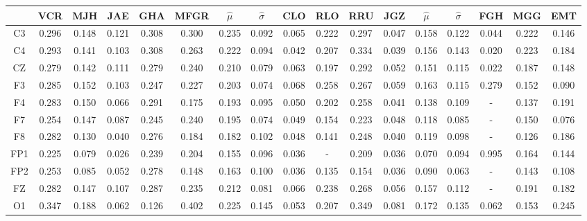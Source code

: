 \begin{SidewaysFigure}
\centering
\begin{tabular}{c||ccccc|cc||cccc|cc||ccc}
& VCR & MJH & JAE & GHA & MFGR &$\widehat{\mu}$ & $\widehat{\sigma}$
& CLO & RLO & RRU & JGZ &$\widehat{\mu}$ & $\widehat{\sigma}$
& FGH & MGG & EMT \\
\hline
 C3 & 0.296    & 0.148    & 0.121    & 0.308    & 0.300    & 0.235    & 0.092    & 0.065    & 0.222    & 0.297    & 0.047    & 0.158    & 0.122    & 0.044    & 0.222    & 0.146     \\
 C4 & 0.293    & 0.141    & 0.103    & 0.308    & 0.263    & 0.222    & 0.094    & 0.042    & 0.207    & 0.334    & 0.039    & 0.156    & 0.143    & 0.020    & 0.223    & 0.184     \\
 CZ & 0.279    & 0.142    & 0.111    & 0.279    & 0.240    & 0.210    & 0.079    & 0.063    & 0.197    & 0.292    & 0.052    & 0.151    & 0.115    & 0.022    & 0.187    & 0.148     \\
 F3 & 0.285    & 0.152    & 0.103    & 0.247    & 0.227    & 0.203    & 0.074    & 0.068    & 0.258    & 0.267    & 0.059    & 0.163    & 0.115    & 0.279    & 0.152    & 0.090     \\
 F4 & 0.283    & 0.150    & 0.066    & 0.291    & 0.175    & 0.193    & 0.095    & 0.050    & 0.202    & 0.258    & 0.041    & 0.138    & 0.109    & -      & 0.137    & 0.191     \\
 F7 & 0.254    & 0.147    & 0.087    & 0.245    & 0.240    & 0.195    & 0.074    & 0.049    & 0.154    & 0.223    & 0.048    & 0.118    & 0.085    & -      & 0.150    & 0.076     \\
 F8 & 0.282    & 0.130    & 0.040    & 0.276    & 0.184    & 0.182    & 0.102    & 0.048    & 0.141    & 0.248    & 0.040    & 0.119    & 0.098    & -      & 0.126    & 0.186     \\
 FP1 & 0.225    & 0.079    & 0.026    & 0.239    & 0.204    & 0.155    & 0.096    & 0.036    & -      & 0.209    & 0.036    & 0.070    & 0.094    & 0.995    & 0.164    & 0.144     \\
 FP2 & 0.253    & 0.085    & 0.052    & 0.278    & 0.148    & 0.163    & 0.100    & 0.036    & 0.135    & 0.154    & 0.036    & 0.090    & 0.063    & -      & 0.143    & 0.108     \\
 FZ & 0.282    & 0.147    & 0.107    & 0.287    & 0.235    & 0.212    & 0.081    & 0.066    & 0.238    & 0.268    & 0.056    & 0.157    & 0.112    & -      & 0.191    & 0.182     \\
 O1 & 0.347    & 0.188    & 0.062    & 0.126    & 0.402    & 0.225    & 0.145    & 0.053    & 0.207    & 0.349    & 0.081    & 0.172    & 0.135    & 0.062    & 0.153    & 0.245     \\

\end{tabular}
\end{SidewaysFigure}
